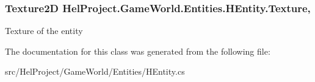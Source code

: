 \hypertarget{class_hel_project_1_1_game_world_1_1_entities_1_1_h_entity_a11ba8f188ffd338f024d396ab0b27cbb}{}
\subsubsection[{Texture}]{\setlength{\rightskip}{0pt plus 5cm}Texture2\+D Hel\+Project.\+Game\+World.\+Entities.\+H\+Entity.\+Texture\hspace{0.3cm}{\ttfamily [get]}, {\ttfamily [set]}}\label{class_hel_project_1_1_game_world_1_1_entities_1_1_h_entity_a11ba8f188ffd338f024d396ab0b27cbb}


Texture of the entity 



The documentation for this class was generated from the following file\+:\begin{DoxyCompactItemize}
\item 
src/\+Hel\+Project/\+Game\+World/\+Entities/H\+Entity.\+cs\end{DoxyCompactItemize}
